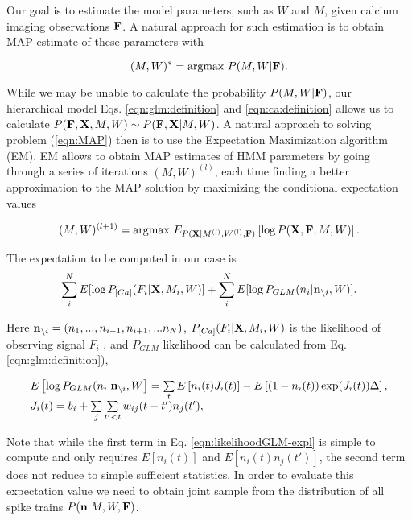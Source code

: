 Our goal is to estimate the model parameters, such as $W$ and $M$, given calcium imaging observations ${\bf F}$. A natural approach for such estimation is to obtain MAP estimate of these parameters with

\begin{equation}\label{eqn:MAP}
(M, W)^*=\text{argmax } P(M, W|{\bf F}).
\end{equation}

While we may be unable to calculate the probability $P(M, W|{\bf F})$, our hierarchical model Eqs. \eqref{eqn:glm:definition} and \eqref{eqn:ca:definition} allows us to calculate $P({\bf F}, {\bf X}, M, W)\sim P({\bf F}, {\bf X}|M, W)$. A natural approach to solving problem (\ref{eqn:MAP}) then is to use the Expectation Maximization algorithm (EM).  EM allows to obtain MAP estimates of HMM parameters by going through a series of iterations $(M, W)^{(l)}$, each time finding a better approximation to the MAP solution by maximizing the conditional expectation values

\begin{equation}
(M, W)^{(l+1)}=\text{argmax }E_{P({\bf X}|M^{(l)}, W^{(l)}, {\bf F})}\left[\log P({\bf X}, {\bf F}, M, W)\right].
\end{equation}

The expectation to be computed in our case is
\begin{equation}\label{eqn:loglik:definition-expl}
\sum_i^N E[\log P_{[Ca]}(F_i|{\bf X}, M_i, W)] + \sum_i^N E[\log P_{GLM}(n_i|{\bf n}_{\backslash i}, W)].
\end{equation}

Here ${\bf n}_{\backslash i}=(n_1, ..., n_{i-1}, n_{i+1}, ...n_N)$, $P_{[Ca]}(F_i|{\bf X}, M_i, W)$ is the likelihood of observing signal $F_i$ \cite{Vogelstein2009}, and $P_{GLM}$ likelihood can be calculated from Eq. \eqref{eqn:glm:definition}), 

\begin{equation}\label{eqn:likelihoodGLM-expl}
\begin{array}{l}
E\left[\log P_{GLM}(n_i|{\bf n}_{\backslash i}, W\right]=\sum\limits_t E \left[ n_i(t) J_i(t)\right] - E\left[(1-n_i(t)) \exp(J_i(t)) \Delta \right], \\
J_i(t)=b_i+\sum\limits_{j} \sum\limits_{t'<t} w_{ij}(t-t')n_{j}(t'), 
\end{array}
\end{equation}

Note that while the first term in Eq. \eqref{eqn:likelihoodGLM-expl} is simple to compute and only requires $E[n_i(t)]$ and $E[n_i(t) n_{j}(t')]$, the second term does not reduce to simple sufficient statistics. In order to evaluate this expectation value we need to obtain joint sample from the distribution of all spike trains $P({\bf n}|M, W, {\bf F})$.

